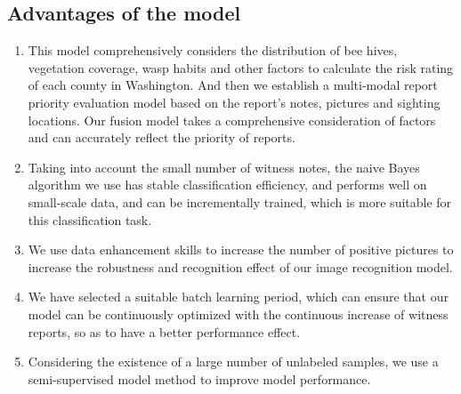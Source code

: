 \documentclass{mcmthesis}
\numberwithin{figure}{section}
\numberwithin{table}{section}
\begin{document}
\subsection{Advantages of the model}

\begin{enumerate}
  \item This model comprehensively considers the distribution of bee hives, vegetation coverage, wasp habits and other factors to calculate the risk rating of each county in Washington. And then we establish a multi-modal report priority evaluation model based on the report's notes, pictures and sighting locations. Our fusion model takes a comprehensive consideration of factors and can accurately reflect the priority of reports.
  \item Taking into account the small number of witness notes, the naive Bayes algorithm we use has stable classification efficiency, and performs well on small-scale data, and can be incrementally trained, which is more suitable for this classification task.
  \item We use data enhancement skills to increase the number of positive pictures to increase the robustness and recognition effect of our image recognition model.
  \item We have selected a suitable batch learning period, which can ensure that our model can be continuously optimized with the continuous increase of witness reports, so as to have a better performance effect.
  \item Considering the existence of a large number of unlabeled samples, we use a semi-supervised model method to improve model performance.
\end{enumerate}
\end{document}
